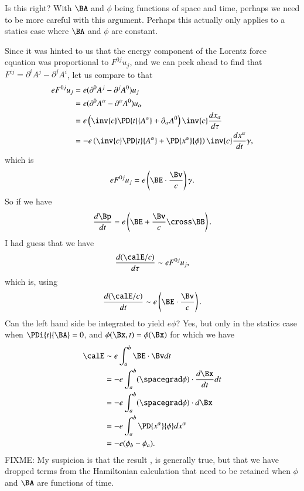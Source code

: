 {Is this right?  With \(\BA\) and \(\phi\) being functions of space and time, perhaps we need to be more careful with this argument.  Perhaps this actually only applies to a statics case where \(\BA\) and \(\phi\) are constant.

Since it was hinted to us that the energy component of the Lorentz force equation was proportional to \(F^{0j} u_j\), and we can peek ahead to find that \(F^{ij} = \partial^i A^j - \partial^j A^i\), let us compare to that
%
\begin{equation}\label{eqn:relativisticElectrodynamicsT3:1090}
\begin{aligned}
e F^{0 j} u_j
&=
e (\partial^0 A^j - \partial^j A^0) u_j \\
&=
e (\partial^0 A^\alpha - \partial^\alpha A^0) u_\alpha \\
&=
e \left( \inv{c} \PD{t}{A^\alpha} + \partial_\alpha A^0 \right) \inv{c} \frac{dx_\alpha}{d\tau} \\
&=
-e \left( \inv{c} \PD{t}{A^\alpha} + \PD{x^\alpha}{\phi} \right) \inv{c} \frac{dx^\alpha}{dt} \gamma,
\end{aligned}
\end{equation}
%
which is
%
\begin{equation}\label{eqn:relativisticElectrodynamicsT3:910}
e F^{0 j} u_j = e \left(\BE \cdot \frac{\Bv}{c}\right) \gamma.
\end{equation}
%
So if we have
%
\begin{equation}\label{eqn:relativisticElectrodynamicsT3:920}
\frac{d\Bp}{dt} = e \left( \BE + \frac{\Bv}{c} \cross \BB \right).
\end{equation}
%
I had guess that we have
%
\begin{equation}\label{eqn:relativisticElectrodynamicsT3:940}
\frac{d(\calE/c)}{d\tau} \sim e F^{0 j} u_j,
\end{equation}
%
which is, using 
%
\begin{equation}\label{eqn:relativisticElectrodynamicsT3:950}
\frac{d(\calE/c)}{dt} \sim e \left(\BE \cdot \frac{\Bv}{c}\right).
\end{equation}
%
Can the left hand side be integrated to yield \(e \phi\)?  Yes, but only in the statics case when \(\PDi{t}{\BA} = 0\), and \(\phi(\Bx,t) = \phi(\Bx)\) for which we have
%
\begin{equation}\label{eqn:relativisticElectrodynamicsT3:1110}
\begin{aligned}
\calE
&\sim e \int_a^b \BE \cdot \Bv dt \\
&= -e \int_a^b (\spacegrad \phi) \cdot \frac{d \Bx}{dt} dt \\
&= -e \int_a^b (\spacegrad \phi) \cdot d \Bx \\
&= -e \int_a^b \PD{x^\alpha}{\phi} d x^\alpha \\
&= -e (\phi_b - \phi_a).
\end{aligned}
\end{equation}
%
FIXME: My suspicion is that the result , is generally true, but that we have dropped terms from the Hamiltonian calculation that need to be retained when \(\phi\) and \(\BA\) are functions of time.
%
}
